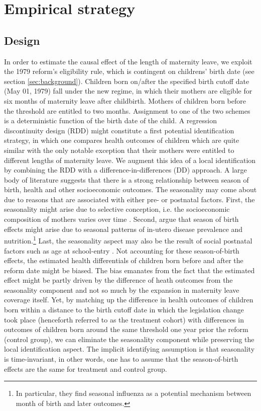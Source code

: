 \documentclass[11pt, a4paper]{article} %
\begin{document}
\section{Empirical strategy}\label{sec:empirical_strategy}
\subsection{Design}\label{sec:empirical_strategy_1design}
In order to estimate the causal effect of the length of maternity leave, we exploit the 1979 reform's eligibility rule, which is contingent on childrens' birth date (see section \ref{sec:background}). Children born on/after the specified birth cutoff date (May 01, 1979) fall under the new regime, in which their mothers are eligible for six months of maternity leave after childbirth. Mothers of children born before the threshold are entitled to two months. Assignment to one of the two schemes is a deterministic function of the birth date of the child. A regression discontinuity design (RDD) might constitute a first potential identification strategy, in which one compares health outcomes of children which are quite similar with the only notable exception that their mothers were entitled to different lengths of maternity leave.\newline 
We augment this idea of a local identification by combining the RDD with a difference-in-differences (DD) approach. A large body of literature suggests that there is a strong relationship between season of birth, health and other socioeconomic outcomes. The seasonality may come about due to reasons that are associated with either pre- or postnatal factors. First, the seasonality might arise due to selective conception, i.e. the socioeconomic composition of mothers varies over time \citep{buckles2013season}. Second, \cite{currie2013within} argue that season of birth effects might arise due to seasonal patterns of in-utero disease prevalence and nutrition.\footnote{In particular, they find seasonal influenza as a potential mechanism between month of birth and later outcomes.} Last, the seasonality aspect may also be the result of social postnatal factors such as age at school-entry \citep{black2011too}. \newline Not accounting for these season-of-birth effects, the estimated health differentials of children born before and after the reform date might be biased. The bias emanates from the fact that the estimated effect might be partly driven by the difference of heath outcomes from the seasonality component and not so much by the expansion in maternity leave coverage itself. Yet, by matching up the difference in health outcomes of children born within a distance to the birth cutoff date in which the legislation change took place (henceforth referred to as the treatment cohort) with differences in outcomes of children born around the same threshold one year prior the reform (control group), we can eliminate the seasonality component while preserving the local identification aspect. The implicit identifying assumption is that seasonality is time-invariant, in other words, one has to assume that the season-of-birth effects are the same for treatment and control group.\newline
\end{document}
